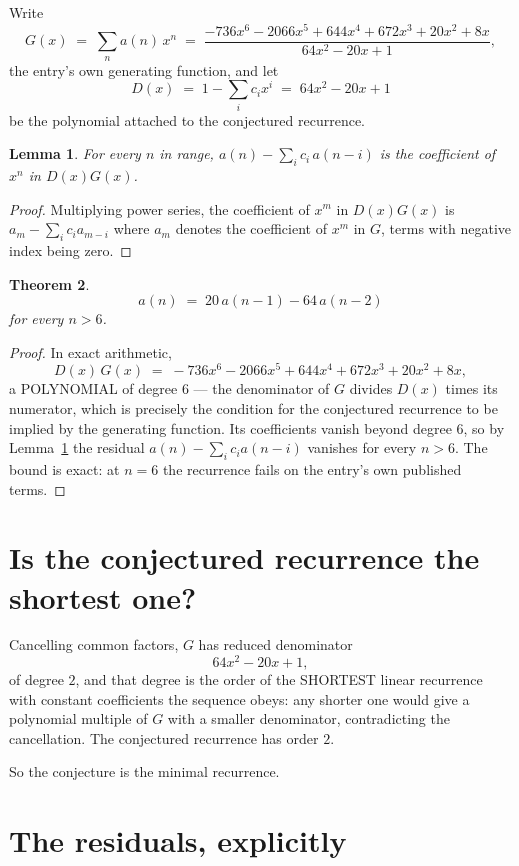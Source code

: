 \documentclass[11pt,a4paper]{article}
\theoremstyle{plain}
\newtheorem{theorem}{Theorem}
\newtheorem{lemma}[theorem]{Lemma}
\theoremstyle{definition}
\begin{document}
Write
\[
G(x)\;=\;\sum_{n}a(n)\,x^{n}\;=\;\frac{- 736 x^{6} - 2066 x^{5} + 644 x^{4} + 672 x^{3} + 20 x^{2} + 8 x}{64 x^{2} - 20 x + 1},
\]
the entry's own generating function, and let
\[
D(x)\;=\;1-\sum_i c_i x^{i}\;=\;64 x^{2} - 20 x + 1
\]
be the polynomial attached to the conjectured recurrence.

\begin{lemma}\label{lem:key}
For every $n$ in range, $a(n)-\sum_i c_i\,a(n-i)$ is the coefficient of $x^{n}$ in
$D(x)G(x)$.
\end{lemma}

\begin{proof}
Multiplying power series, the coefficient of $x^{m}$ in $D(x)G(x)$ is
$a_m-\sum_i c_i a_{m-i}$ where $a_m$ denotes the coefficient of $x^{m}$ in $G$, terms with
negative index being zero.
\end{proof}

\begin{theorem}
\[
a(n)\;=\;20\,a(n-1) - 64\,a(n-2)
\]
for every $n>6$.
\end{theorem}

\begin{proof}
In exact arithmetic,
\[
D(x)\,G(x)\;=\;- 736 x^{6} - 2066 x^{5} + 644 x^{4} + 672 x^{3} + 20 x^{2} + 8 x,
\]
a POLYNOMIAL of degree $6$ --- the denominator of $G$ divides $D(x)$ times its numerator,
which is precisely the condition for the conjectured recurrence to be implied by the
generating function. Its coefficients vanish beyond degree $6$, so by
Lemma~\ref{lem:key} the residual $a(n)-\sum_ic_ia(n-i)$ vanishes for every
$n>6$. The bound is exact: at $n=6$ the recurrence fails on the entry's own published terms.
\end{proof}

\section{Is the conjectured recurrence the shortest one?}

Cancelling common factors, $G$ has reduced denominator
\[
64 x^{2} - 20 x + 1,
\]
of degree $2$, and that degree is the order of the SHORTEST linear recurrence with
constant coefficients the sequence obeys: any shorter one would give a polynomial multiple of
$G$ with a smaller denominator, contradicting the cancellation. The conjectured recurrence has
order $2$.

So the conjecture is the minimal recurrence.

\section{The residuals, explicitly}
\end{document}

